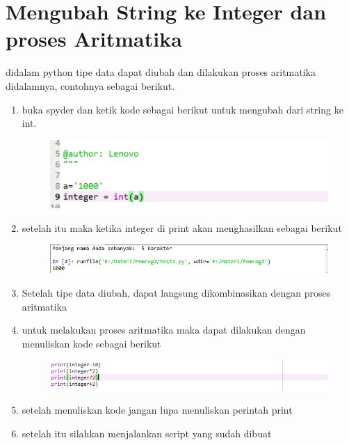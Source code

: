 \chapter*{Mengubah String ke Integer dan proses Aritmatika}

\par
didalam python tipe data dapat diubah dan dilakukan proses aritmatika didalamnya, contohnya sebagai berikut.

\begin{enumerate}
	\item buka spyder dan ketik kode sebagai berikut untuk mengubah dari string ke int.
	\begin{figure} [h]
	\includegraphics[width=12cm]{string/str1.png}
	\centering
	\end{figure}
	
	\item setelah itu maka ketika integer di print akan menghasilkan sebagai berikut
	\begin{figure} [h]
	\includegraphics[width=12cm]{string/str2.png}
	\centering
	\end{figure}
	
	\item Setelah tipe data diubah, dapat langsung dikombinasikan dengan proses aritmatika
	
	\item untuk melakukan proses aritmatika maka dapat dilakukan dengan menuliskan kode sebagai berikut
	\begin{figure} [h]
	\includegraphics[width=12cm]{string/str3.png}
	\centering
	\end{figure}
	
	
	\item setelah menuliskan kode jangan lupa menuliskan perintah print
	
	\item setelah itu silahkan menjalankan script yang sudah dibuat
	

	
	

	\end{enumerate}
	
	

